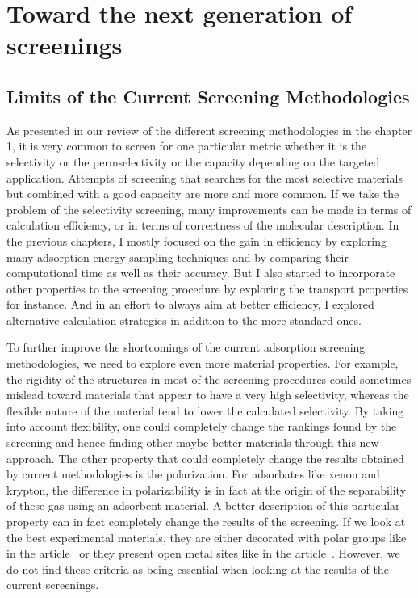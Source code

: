 \documentclass[main]{subfiles}
\begin{document}
\chapter{Toward the next generation of screenings}
\vspace*{-1\baselineskip}

\section{Limits of the Current Screening Methodologies}

As presented in our review of the different screening methodologies in the chapter 1, it is very common to screen for one particular metric whether it is the selectivity or the permselectivity or the capacity depending on the targeted application. Attempts of screening that searches for the most selective materials but combined with a good capacity are more and more common.\autocite{Chung_2019,Zhang_2022,Solanki_2020} If we take the problem of the selectivity screening, many improvements can be made in terms of calculation efficiency, or in terms of correctness of the molecular description. In the previous chapters, I mostly focused on the gain in efficiency by exploring many adsorption energy sampling techniques and by comparing their computational time as well as their accuracy. But I also started to incorporate other properties to the screening procedure by exploring the transport properties for instance. And in an effort to always aim at better efficiency, I explored alternative calculation strategies in addition to the more standard ones. 

To further improve the shortcomings of the current adsorption screening methodologies, we need to explore even more material properties. For example, the rigidity of the structures in most of the screening procedures could sometimes mislead toward materials that appear to have a very high selectivity, whereas the flexible nature of the material tend to lower the calculated selectivity. By taking into account flexibility, one could completely change the rankings found by the screening and hence finding other maybe better materials through this new approach. The other property that could completely change the results obtained by current methodologies is the polarization. For adsorbates like xenon and krypton, the difference in polarizability is in fact at the origin of the separability of these gas using an adsorbent material. A better description of this particular property can in fact completely change the results of the screening. If we look at the best experimental materials, they are either decorated with polar groups like in the article~\cite{Li_2019} or they present open metal sites like in the article~\cite{Pei_2022}. However, we do not find these criteria as being essential when looking at the results of the current screenings. 
\end{document}
